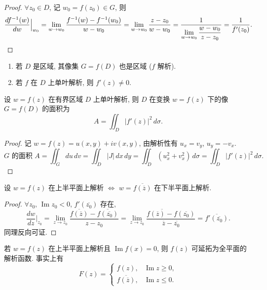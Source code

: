 \documentclass[theorem=false,mathfont=none,openany,sub3section]{easybook}
\begin{document}
\begin{proof}
  $\forall z_{0}\in D$, 记 $w_{0}=f(z_{0})\in G$, 则
  \[
  \Bigl.\frac{df^{-1}(w)}{dw}\Bigr|_{w_{0}}
  =\lim_{w\to w_{0}}\frac{f^{-1}(w)-f^{-1}(w_{0})}{w-w_{0}}
  =\lim_{w\to w_{0}}\frac{z-z_{0}}{w-w_{0}}
  =\frac{1}{\displaystyle\lim_{w\to w_{0}}\frac{w-w_{0}}{z-z_{0}}}
  =\frac{1}{f'(z_{0})}.
  \]
\end{proof}

\begin{remark}
  \begin{enumerate}
    \item 若 $D$ 是区域, 其像集 $G=f(D)$ 也是区域 ($f$ 解析).
    \item 若 $f$ 在 $D$ 上单叶解析, 则 $f'(z)\neq0$.
  \end{enumerate}
\end{remark}

\begin{example}
  设 $w=f(z)$ 在有界区域 $D$ 上单叶解析, 则 $D$ 在变换 $w=f(z)$ 下的像 $G=f(D)$ 的面积为
  \[
  A=\iint_{D}|f'(z)|^{2}\,d\sigma.
  \]
\end{example}

\begin{proof}
  记 $w=f(z)=u(x,y)+iv(x,y)$, 由解析性有 $u_{x}=v_{y}$, $u_{y}=-v_{x}$.
  \[
  G\text{ 的面积 }A=\iint_{G}du\,dv
  =\iint_{D}|J|\,dx\,dy
  =\iint_{D}(u_{x}^{2}+v_{x}^{2})\,d\sigma
  =\iint_{D}|f'(z)|^{2}\,d\sigma.
  \]
\end{proof}

\begin{example}
  设 $w=f(z)$ 在上半平面上解析 $\Leftrightarrow$ $w=\overline{f(\overline{z})}$ 在下半平面上解析.
\end{example}

\begin{proof}
  $\forall z_{0}$, $\operatorname{Im}z_{0}<0$, $f'(\overline{z_{0}})$ 存在,
  \[
  \frac{dw}{dz}\Bigr|_{z_{0}}
  =\lim_{z\to z_{0}}\frac{\overline{f(\overline{z})}-\overline{f(\overline{z_{0}})}}{z-z_{0}}
  =\overline{\lim_{z\to z_{0}}\frac{f(\overline{z})-f(\overline{z_{0}})}{\overline{z}-\overline{z_{0}}}}
  =\overline{f'(\overline{z_{0}})}.
  \]
  同理反向可证.
\end{proof}

\begin{remark}
  若 $w=f(z)$ 在上半平面上解析且 $\operatorname{Im}f(x)=0$, 则 $f(z)$ 可延拓为全平面的解析函数.
  事实上有
  \[
  F(z)=\begin{cases}
    f(z), & \operatorname{Im}z\geq0,\\[2pt]
    \overline{f(\overline{z})}, & \operatorname{Im}z\leq0.
  \end{cases}
  \]
\end{remark}
\end{document}

